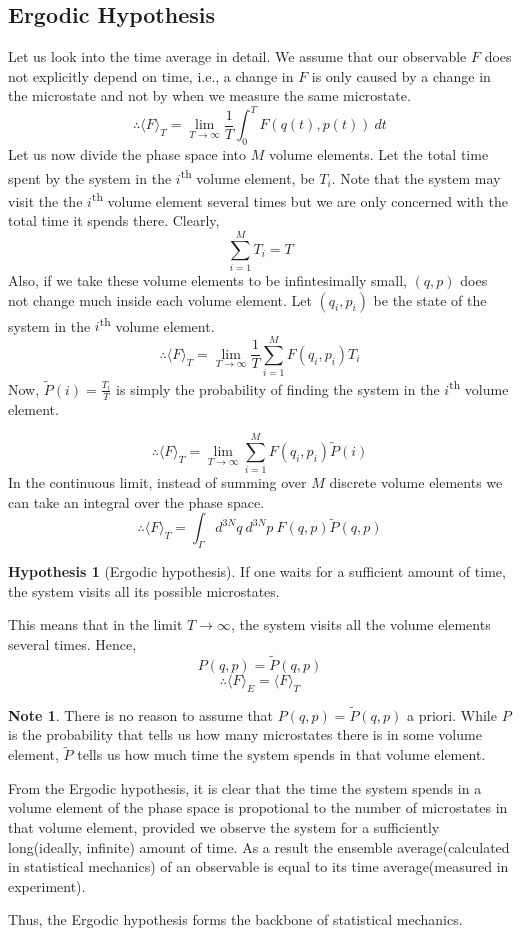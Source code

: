 \documentclass[10pt, a4paper]{extarticle}
\theoremstyle{definition}
\newtheorem*{note*}{Note}
\newtheorem*{hyp*}{Hypothesis}
\begin{document}
\subsection{Ergodic Hypothesis}
Let us look into the time average in detail. We assume that our observable $F$ does not explicitly depend on time, i.e., a change in $F$ is only caused by a change in the microstate and not by when we measure the same microstate.
\[\therefore \langle F\rangle_T=\lim_{T\to\infty}\frac{1}{T}\int_{0}^T F(q(t),p(t))\ dt\]
Let us now divide the phase space into $M$ volume elements. Let the total time spent by the system in the $i$\textsuperscript{th} volume element, be $T_i$. Note that the system may visit the the $i$\textsuperscript{th} volume element several times but we are only concerned with the total time it spends there. Clearly,
\[\sum_{i=1}^{M}T_i=T\]
Also, if we take these volume elements to be infintesimally small, $(q,p)$ does not change much inside each volume element. Let $(q_i,p_i)$ be the state of the system in the $i$\textsuperscript{th} volume element.
\[\therefore \langle F\rangle_T=\lim_{T\to\infty}\frac{1}{T}\sum_{i=1}^M F(q_i,p_i)T_i\]
Now, $\tilde{P}(i)=\frac{T_i}{T}$ is simply the probability of finding the system in the $i$\textsuperscript{th} volume element.

\[\therefore\langle F\rangle_T=\lim_{T\to\infty}\sum_{i=1}^M F(q_i,p_i)\tilde{P}(i)\]
In the continuous limit, instead of summing over $M$ discrete volume elements we can take an integral over the phase space.
\[\therefore \langle F\rangle_T =\int_{\Gamma}d^{3N}q\ d^{3N}p\ F(q,p)\tilde{P}(q,p)\]
\begin{framed}
\begin{hyp*}[Ergodic hypothesis]
	If one waits for a sufficient amount of time, the system visits all its possible microstates.

	This means that in the limit $T\to\infty$, the system visits all the volume elements several times. Hence,
	\[P(q,p)=\tilde{P}(q,p)\]\[\therefore \langle F\rangle_E=\langle F\rangle_T\]
\end{hyp*}
\end{framed}
\begin{note*}
	There is no reason to assume that $P(q,p)=\tilde{P}(q,p)$ a priori. While $P$ is the probability that tells us how many microstates there is in some volume element, $\tilde{P}$ tells us how much time the system spends in that volume element.

	From the Ergodic hypothesis, it is clear that the time the system spends in a volume element of the phase space is propotional to the number of microstates in that volume element, provided we observe the system for a sufficiently long(ideally, infinite) amount of time. As a result the ensemble average(calculated in statistical mechanics) of an observable is equal to its time average(measured in experiment).

	Thus, the Ergodic hypothesis forms the backbone of statistical mechanics.
\end{note*}
\end{document}
